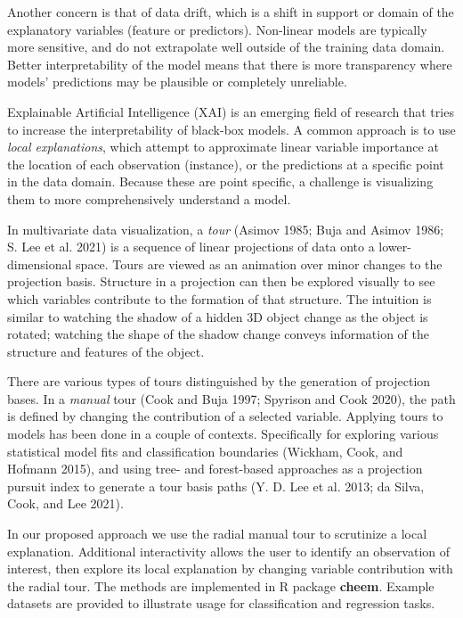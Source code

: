 \documentclass[
]{article}
\begin{document}
Another concern is that of data drift, which is a shift in support or domain of the explanatory variables (feature or predictors). Non-linear models are typically more sensitive, and do not extrapolate well outside of the training data domain. Better interpretability of the model means that there is more transparency where models' predictions may be plausible or completely unreliable.

Explainable Artificial Intelligence (XAI) is an emerging field of research that tries to increase the interpretability of black-box models. A common approach is to use \emph{local explanations}, which attempt to approximate linear variable importance at the location of each observation (instance), or the predictions at a specific point in the data domain. Because these are point specific, a challenge is visualizing them to more comprehensively understand a model.

In multivariate data visualization, a \emph{tour} (Asimov 1985; Buja and Asimov 1986; S. Lee et al. 2021) is a sequence of linear projections of data onto a lower-dimensional space. Tours are viewed as an animation over minor changes to the projection basis. Structure in a projection can then be explored visually to see which variables contribute to the formation of that structure. The intuition is similar to watching the shadow of a hidden 3D object change as the object is rotated; watching the shape of the shadow change conveys information of the structure and features of the object.

There are various types of tours distinguished by the generation of projection bases. In a \emph{manual} tour (Cook and Buja 1997; Spyrison and Cook 2020), the path is defined by changing the contribution of a selected variable. Applying tours to models has been done in a couple of contexts. Specifically for exploring various statistical model fits and classification boundaries (Wickham, Cook, and Hofmann 2015), and using tree- and forest-based approaches as a projection pursuit index to generate a tour basis paths (Y. D. Lee et al. 2013; da Silva, Cook, and Lee 2021).

In our proposed approach we use the radial manual tour to scrutinize a local explanation. Additional interactivity allows the user to identify an observation of interest, then explore its local explanation by changing variable contribution with the radial tour. The methods are implemented in R package \textbf{cheem}. Example datasets are provided to illustrate usage for classification and regression tasks.
\end{document}
